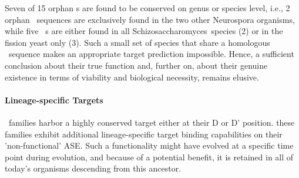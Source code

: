Seven of 15 orphan \haca s are found to be conserved  on genus or
species level, i.e., 2 orphan \ncr\ sequences are exclusively found in the
two other Neurospora organisms, while five \spo\ \sno s are either found in
all Schizosaccharomyces\ species (2) or in the fission yeast only (3). Such
a small set of species that share a homologous \sno\ sequence makes an
appropriate target prediction impossible. Hence, a sufficient conclusion
about their true function and, further on, about their genuine existence in
terms of viability and biological necessity, remains elusive.

\paragraph{Lineage-specific Targets}
 \cd\ families harbor a highly conserved target either at
their D or D' position. 
these families exhibit additional lineage-specific target binding
capabilities on their 'non-functional' ASE. Such a functionality might have
evolved at a specific time point during evolution, and because of a
potential benefit, it is retained in all of today's organisms descending
from this ancestor.

